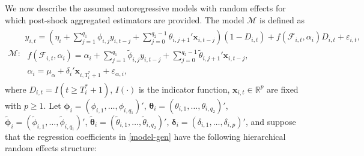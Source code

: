 \documentclass[11pt]{article}
\newcommand{\R}{\mathbb{R}}
\newcommand{\x}{\textbf{x}}
\def\mbf#1{\mathbf{#1}} %
\def\t#1{\tilde{#1}} %
\def\mc#1{\mathcal{#1}} %
\def\mc#1{\mathcal{#1}}
\theoremstyle{definition}
\begin{document}
We now describe the assumed autoregressive models with random effects for which post-shock aggregated estimators are provided. The model $\mc{M}$ is defined as
\begin{align}
\mc{M} \colon \begin{array}{l}
  y_{i,t} = \left(\eta_i + \sum_{j=1}^{q_1}\phi_{i,j}y_{i, t-j} + \sum_{j=0}^{q_2-1}\theta_{i,j+1}'\mbf{x}_{i,t-j}\right)(1 - D_{i,t}) + f(\mathcal{F}_{i,t},\alpha_i)D_{i,t} + \varepsilon_{i,t},\\[.2cm]
  \; f(\mc{F}_{i,t},\alpha_i) = \alpha_i +  \sum_{j=1}^{q_{1}}\t\phi_{i,j}y_{i, t-j} + \sum_{j=0}^{q_2-1}\t\theta_{i,j+1}'\mbf{x}_{i,t-j}, \\[.2cm]
  \; \alpha_i = \mu_{\alpha} + \delta_i'\mbf{x}_{i, T_i^*+1} + \varepsilon_{\alpha, i},
\end{array}\label{model-gen}
\end{align}
where $D_{i,t} = I(t \geq T_i^* + 1)$, $I(\cdot)$ is the indicator function, $\x_{i,t} \in \R^{p}$ are fixed with $p \geq 1$. Let 
$\mathbf{\phi}_i = (\phi_{i,1},\ldots,\phi_{i,q_1})'$, 
$\mathbf{\theta}_i = (\theta_{i,1},\ldots,\theta_{i,q_2})'$, 
$\tilde{\mathbf{\phi}}_i = (\t\phi_{i,1},\ldots,\t\phi_{i,q_{1}})'$, 
$\tilde{\mathbf{\theta}}_i = (\t\theta_{i,1},\ldots,\t\theta_{i, q_{2}})'$, 
$\mathbf{\delta}_i = (\delta_{i,1},\ldots,\delta_{i,p})'$, 
and suppose that the regression coefficients in \eqref{model-gen} have the following hierarchical random effects structure: 
\end{document}
